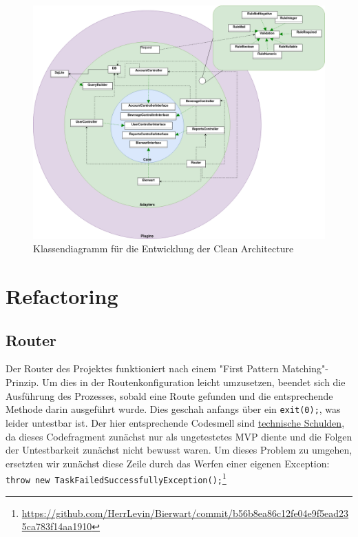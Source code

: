 \documentclass[12pt,a4paper,titlepage,ngerman,pdftex]{report}
\begin{document}
    \begin{figure}[h!]
        \includegraphics[width=\linewidth]{Bierwart.drawio.png}
        \caption{Klassendiagramm für die Entwicklung der Clean Architecture}
        \label{fig:klassendiagramm}
    \end{figure}

    \section{Refactoring}\label{sec:refactoring}

    \subsection{Router}\label{subsec:router}
    Der Router des Projektes funktioniert nach einem "First Pattern Matching"-Prinzip.
    Um dies in der Routenkonfiguration leicht umzusetzen, beendet sich die Ausführung des Prozesses, sobald eine Route gefunden und die entsprechende Methode darin ausgeführt wurde.
    Dies geschah anfangs über ein \verb|exit(0);|, was leider untestbar ist.
    Der hier entsprechende Codesmell sind \href{https://refactoring.guru/refactoring/technical-debt}{technische Schulden}, da dieses Codefragment zunächst nur als ungetestetes MVP diente und die Folgen der \glqq Untestbarkeit\grqq{} zunächst nicht bewusst waren.
    Um dieses Problem zu umgehen, ersetzten wir zunächst diese Zeile durch das Werfen einer eigenen Exception: \verb|throw new TaskFailedSuccessfullyException();|\footnote{\url{https://github.com/HerrLevin/Bierwart/commit/b56b8ea86c12fe04e9f5ead235ca783f14aa1910}}
\end{document}
